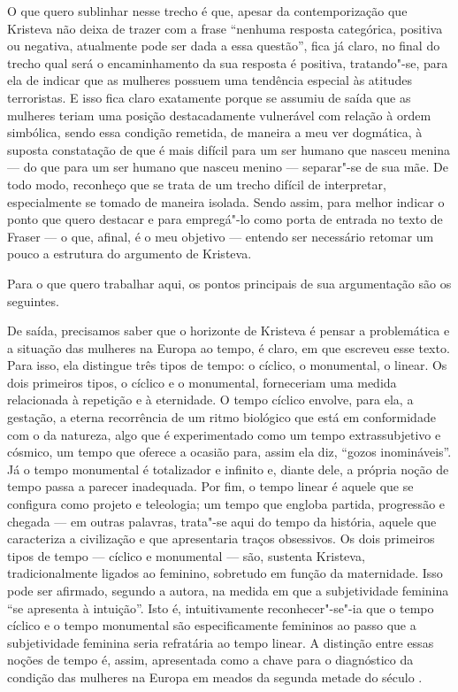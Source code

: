 O que quero sublinhar nesse trecho é que, apesar da contemporização que
Kristeva não deixa de trazer com a frase ``nenhuma resposta categórica,
positiva ou negativa, atualmente pode ser dada a essa questão'', fica já
claro, no final do trecho qual será o encaminhamento da sua resposta é
positiva, tratando"-se, para ela de indicar que as mulheres possuem uma
tendência especial às atitudes terroristas. E isso fica claro exatamente
porque se assumiu de saída que as mulheres teriam uma posição
destacadamente vulnerável com relação à ordem simbólica, sendo essa
condição remetida, de maneira a meu ver dogmática, à suposta constatação
de que é mais difícil para um ser humano que nasceu menina --- do que
para um ser humano que nasceu menino --- separar"-se de sua mãe. De todo
modo, reconheço que se trata de um trecho difícil de interpretar,
especialmente se tomado de maneira isolada. Sendo assim, para melhor
indicar o ponto que quero destacar e para empregá"-lo como porta de
entrada no texto de Fraser --- o que, afinal, é o meu objetivo --- entendo
ser necessário retomar um pouco a estrutura do argumento de Kristeva.

Para o que quero trabalhar aqui, os pontos principais de sua
argumentação são os seguintes.

De saída, precisamos saber que o horizonte de Kristeva é pensar a
problemática e a situação das mulheres na Europa ao tempo, é claro, em
que escreveu esse texto. Para isso, ela distingue três tipos de tempo: o
cíclico, o monumental, o linear. Os dois primeiros tipos, o cíclico e o
monumental, forneceriam uma medida relacionada à repetição e à
eternidade. O tempo cíclico envolve, para ela, a gestação, a eterna
recorrência de um ritmo biológico que está em conformidade com o da
natureza, algo que é experimentado como um tempo extrassubjetivo e
cósmico, um tempo que oferece a ocasião para, assim ela diz, ``gozos
inomináveis''. Já o tempo monumental é totalizador e infinito e, diante
dele, a própria noção de tempo passa a parecer inadequada. Por fim, o
tempo linear é aquele que se configura como projeto e teleologia; um
tempo que engloba partida, progressão e chegada --- em outras palavras,
trata"-se aqui do tempo da história, aquele que caracteriza a civilização
e que apresentaria traços obsessivos. Os dois primeiros tipos de tempo
--- cíclico e monumental --- são, sustenta Kristeva, tradicionalmente
ligados ao feminino, sobretudo em função da maternidade. Isso pode ser
afirmado, segundo a autora, na medida em que a subjetividade feminina
``se apresenta à intuição''. Isto é, intuitivamente reconhecer"-se"-ia que
o tempo cíclico e o tempo monumental são especificamente femininos ao
passo que a subjetividade feminina seria refratária ao tempo linear. A
distinção entre essas noções de tempo é, assim, apresentada como a chave
para o diagnóstico da condição das mulheres na Europa em meados da
segunda metade do século .

